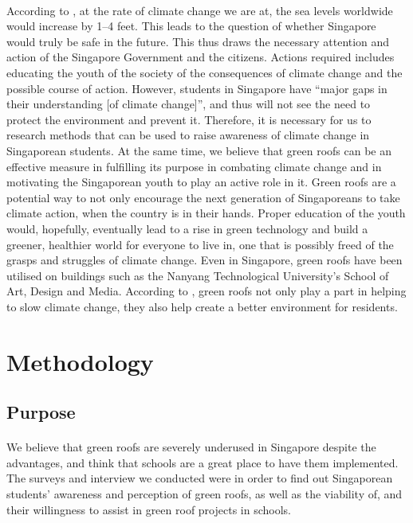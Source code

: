 \documentclass[a4paper]{article}
\begin{document}
\begin{multicols}{2}
  \paragraph{} According to \cite{nasa}, at the rate of climate
  change we are at, the sea levels worldwide would increase by 1--4
  feet. This leads to the question of whether Singapore would truly
  be safe in the future. This thus draws the necessary attention and
  action of the Singapore Government and the citizens. Actions required
  includes educating the youth of the society of the consequences of
  climate change and the possible course of action.  However, students
  in Singapore have ``major gaps in their understanding [of climate
  change]''\parencite{student_carbon_footprint}, and thus will not
  see the need to protect the environment and prevent it. Therefore,
  it is necessary for us to research methods that can be used to raise
  awareness of climate change in Singaporean students. At the same
  time, we believe that green roofs can be an effective measure in
  fulfilling its purpose in combating climate change and in motivating
  the Singaporean youth to play an active role in it. Green roofs are a
  potential way to not only encourage the next generation of Singaporeans
  to take climate action,  when the country is in their hands. Proper
  education of the youth would, hopefully, eventually lead to a rise in
  green technology and build a greener, healthier world for everyone
  to live in, one that is possibly freed of the grasps and struggles
  of climate change. Even in Singapore, green roofs have been utilised
  on buildings such as the Nanyang Technological University's School
  of Art, Design and Media. According to \cite{greenbuild_advant1},
  green roofs not only play a part in helping to slow climate change,
  they also help create a better environment for residents.




  \section{Methodology}
  \subsection{Purpose}
  \paragraph{} We believe that green roofs are severely underused
  in Singapore despite the advantages, and think that schools are a
  great place to have them implemented. The surveys and interview we
  conducted were in order to find out Singaporean students' awareness
  and perception of green roofs, as well as the viability of, and their
  willingness to assist in green roof projects in schools.


\end{multicols}
\end{document}
